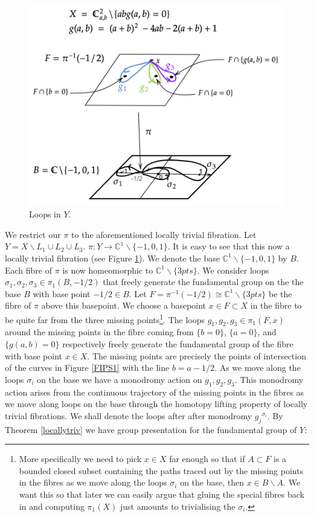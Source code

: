 \documentclass[oneside,reqno]{amsart}
\theoremstyle{definition}
\theoremstyle{definition}
\theoremstyle{definition}
\theoremstyle{definition}
\newcommand{\CC}{\mathbb{C}}
\begin{document}
\begin{figure}[!h]
    \centering
    \includegraphics[width=12cm]{rank2exmp/zariski1.png}
    \caption{Loops in $Y$.}
    \label{zariski1}
\end{figure}
We restrict our $\pi$ to the aforementioned locally trivial fibration. Let $Y= X \backslash L_1 \cup L_2 \cup L_3$. $\pi : Y  \to \CC^1\backslash \{-1,0,1 \}$. It is easy to see that this now a locally trivial fibration (see Figure \ref{zariski1}). We denote the base $\CC^1\backslash \{-1,0,1 \}$ by $B$. Each fibre of $\pi$ is now homeomorphic to $\CC^1 \backslash \{3 pts\}$. We consider loops $\sigma_1,\sigma_2, \sigma_3 \in \pi_1(B,-1/2)$ that freely generate the fundamental group on the the base $B$ with base point $-1/2 \in B$. Let $F=\pi^{-1}(-1/2)\cong \CC^1\backslash \{ 3 pts\}$ be the fibre of $\pi$ above this basepoint. We choose a basepoint $x \in F \subset X$ in the fibre to be quite far from the three missing points\footnote{More specifically we need to pick $x \in X$ far enough so that if $A\subset F$ is a bounded closed subset containing the paths traced out by the missing points in the fibres as we move along the loops $\sigma_i$ on the base, then $x \in B\backslash A$. We want this so that later we can easily argue that gluing the special fibres back in and computing $\pi_1(X)$ just amounts to trivialising the $\sigma_i$.}. The loops $g_1,g_2,g_3 \in \pi_1(F,x)$ around the missing points in the fibre coming from $\{b=0 \}$, $\{ a=0\}$, and $\{g(a,b)=0\}$ respectively freely generate the fundamental group of the fibre with base point $x \in X$. The missing points are precisely the points of intersection of the curves in Figure \ref{FIPS1} with the line $b=a-1/2$. As we move along the loops $\sigma_i$ on the base we have a monodromy action on $g_1,g_2,g_3$. This monodromy action arises from the continuous trajectory of the missing points in the fibres as we move along loops on the base through the homotopy lifting property of locally trivial fibrations. We shall denote the loops after after monodromy ${g_j}^{\sigma_i}$. By Theorem \ref{locallytriv} we have group presentation for the fundamental group of $Y$:
\end{document}
